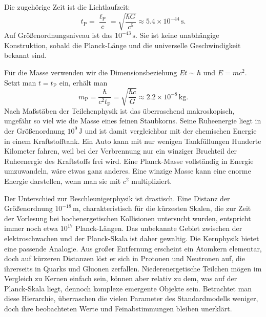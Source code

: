 Die zugehörige Zeit ist die Lichtlaufzeit:
\begin{equation}
t_{\mathrm P}
=\frac{\ell_{\mathrm P}}{c}
=\sqrt{\frac{\hbar G}{c^5}}
\approx 5.4\times10^{-44}\,\mathrm s.
\label{eq:c10-planck-time}
\end{equation}
Auf Größenordnungsniveau ist das \(10^{-43}\,\mathrm s\). Sie ist keine unabhängige Konstruktion, sobald die Planck-Länge und die universelle Geschwindigkeit bekannt sind.

Für die Masse verwenden wir die Dimensionsbeziehung \(Et\sim\hbar\) und \(E=mc^2\). Setzt man \(t=t_{\mathrm P}\) ein, erhält man
\begin{equation}
m_{\mathrm P}
=\frac{\hbar}{c^2t_{\mathrm P}}
=\sqrt{\frac{\hbar c}{G}}
\approx 2.2\times10^{-8}\,\mathrm{kg}.
\label{eq:c10-planck-mass}
\end{equation}
Nach Maßstäben der Teilchenphysik ist das überraschend makroskopisch, ungefähr so viel wie die Masse eines feinen Staubkorns. Seine Ruheenergie liegt in der Größenordnung \(10^9\,\mathrm J\) und ist damit vergleichbar mit der chemischen Energie in einem Kraftstofftank. Ein Auto kann mit nur wenigen Tankfüllungen Hunderte Kilometer fahren, weil bei der Verbrennung nur ein winziger Bruchteil der Ruheenergie des Kraftstoffs frei wird. Eine Planck-Masse vollständig in Energie umzuwandeln, wäre etwas ganz anderes. Eine winzige Masse kann eine enorme Energie darstellen, wenn man sie mit \(c^2\) multipliziert.

Der Unterschied zur Beschleunigerphysik ist drastisch. Eine Distanz der Größenordnung \(10^{-18}\,\mathrm m\), charakteristisch für die kürzesten Skalen, die zur Zeit der Vorlesung bei hochenergetischen Kollisionen untersucht wurden, entspricht immer noch etwa \(10^{17}\) Planck-Längen. Das unbekannte Gebiet zwischen der elektroschwachen und der Planck-Skala ist daher gewaltig. Die Kernphysik bietet eine passende Analogie. Aus großer Entfernung erscheint ein Atomkern elementar, doch auf kürzeren Distanzen löst er sich in Protonen und Neutronen auf, die ihrerseits in Quarks und Gluonen zerfallen. Niederenergetische Teilchen mögen im Vergleich zu Kernen einfach sein, können aber relativ zu dem, was auf der Planck-Skala liegt, dennoch komplexe emergente Objekte sein. Betrachtet man diese Hierarchie, überraschen die vielen Parameter des Standardmodells weniger, doch ihre beobachteten Werte und Feinabstimmungen bleiben unerklärt.

